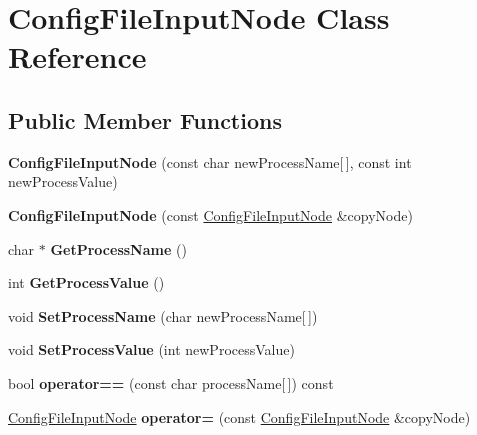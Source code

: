 \hypertarget{class_config_file_input_node}{\section{Config\-File\-Input\-Node Class Reference}
\label{class_config_file_input_node}
}
\subsection*{Public Member Functions}
\begin{DoxyCompactItemize}
\item 
\hypertarget{class_config_file_input_node_afcbe138a1dbe3e77b6bc1881013715f9}{{\bfseries Config\-File\-Input\-Node} (const char new\-Process\-Name\mbox{[}$\,$\mbox{]}, const int new\-Process\-Value)}\label{class_config_file_input_node_afcbe138a1dbe3e77b6bc1881013715f9}

\item 
\hypertarget{class_config_file_input_node_a69ceebec9a7bae4b3223a3dbfad03629}{{\bfseries Config\-File\-Input\-Node} (const \hyperlink{class_config_file_input_node}{Config\-File\-Input\-Node} \&copy\-Node)}\label{class_config_file_input_node_a69ceebec9a7bae4b3223a3dbfad03629}

\item 
\hypertarget{class_config_file_input_node_ac85394f63c949c9a1c4b15d6e8158430}{char $\ast$ {\bfseries Get\-Process\-Name} ()}\label{class_config_file_input_node_ac85394f63c949c9a1c4b15d6e8158430}

\item 
\hypertarget{class_config_file_input_node_afbbc69470e5da2350974103f5e28832d}{int {\bfseries Get\-Process\-Value} ()}\label{class_config_file_input_node_afbbc69470e5da2350974103f5e28832d}

\item 
\hypertarget{class_config_file_input_node_a11428fd463fa71ccce26ba5707b1a5d1}{void {\bfseries Set\-Process\-Name} (char new\-Process\-Name\mbox{[}$\,$\mbox{]})}\label{class_config_file_input_node_a11428fd463fa71ccce26ba5707b1a5d1}

\item 
\hypertarget{class_config_file_input_node_a01c48efded5052eaca6ce388cb43419f}{void {\bfseries Set\-Process\-Value} (int new\-Process\-Value)}\label{class_config_file_input_node_a01c48efded5052eaca6ce388cb43419f}

\item 
\hypertarget{class_config_file_input_node_a3dfaa39d2fdb4a7824df2b5937e55fce}{bool {\bfseries operator==} (const char process\-Name\mbox{[}$\,$\mbox{]}) const }\label{class_config_file_input_node_a3dfaa39d2fdb4a7824df2b5937e55fce}

\item 
\hypertarget{class_config_file_input_node_aa17c992a5e344bc511c69e35a6384369}{\hyperlink{class_config_file_input_node}{Config\-File\-Input\-Node} {\bfseries operator=} (const \hyperlink{class_config_file_input_node}{Config\-File\-Input\-Node} \&copy\-Node)}\label{class_config_file_input_node_aa17c992a5e344bc511c69e35a6384369}

\end{DoxyCompactItemize}


